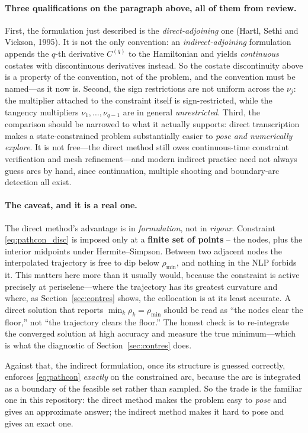 \documentclass[11pt]{article}
\begin{document}
\paragraph{Three qualifications on the paragraph above, all of them from
review.} First, the formulation just described is the \emph{direct-adjoining}
one (Hartl, Sethi and Vickson, 1995). It is not the only convention: an
\emph{indirect-adjoining} formulation appends the $q$-th derivative $C^{(q)}$ to
the Hamiltonian and yields \emph{continuous} costates with discontinuous
derivatives instead. So the costate discontinuity above is a property of the
convention, not of the problem, and the convention must be named---as it now is.
Second, the sign restrictions are not uniform across the $\nu_j$: the multiplier
attached to the constraint itself is sign-restricted, while the tangency
multipliers $\nu_1,\dots,\nu_{q-1}$ are in general \emph{unrestricted}. Third,
the comparison should be narrowed to what it actually supports: direct
transcription makes a state-constrained problem substantially easier to
\emph{pose and numerically explore}. It is not free---the direct method still
owes continuous-time constraint verification and mesh refinement---and modern
indirect practice need not always guess arcs by hand, since continuation,
multiple shooting and boundary-arc detection all exist.

\paragraph{The caveat, and it is a real one.} The direct method's advantage is
in \emph{formulation}, not in \emph{rigour}. Constraint
\eqref{eq:pathcon_disc} is imposed only at a \textbf{finite set of points} --
the nodes, plus the interior midpoints under Hermite--Simpson. Between two
adjacent nodes the interpolated trajectory is free to dip below $\rho_{\min}$,
and nothing in the NLP forbids it. This matters here more than it usually would,
because the constraint is active precisely at periselene---where the trajectory
has its greatest curvature and where, as Section~\ref{sec:contres} shows, the
collocation is at its least accurate. A direct solution that reports
$\min_k \rho_k = \rho_{\min}$ should be read as ``the nodes clear the floor,''
not ``the trajectory clears the floor.'' The honest check is to re-integrate the
converged solution at high accuracy and measure the true minimum---which is what
the diagnostic of Section~\ref{sec:contres} does.

Against that, the indirect formulation, once its structure is guessed correctly,
enforces \eqref{eq:pathcon} \emph{exactly} on the constrained arc, because the
arc is integrated as a boundary of the feasible set rather than sampled. So the
trade is the familiar one in this repository: the direct method makes the
problem easy to \emph{pose} and gives an approximate answer; the indirect method
makes it hard to pose and gives an exact one.
\end{document}
